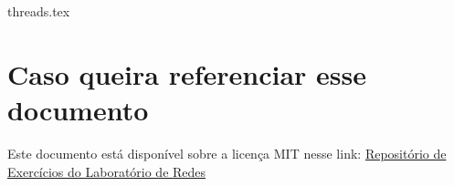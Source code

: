 \documentclass{article}
\author{}
\date{}
\title{}
\begin{document}
    

    {threads.tex}

    \section*{Caso queira referenciar esse documento}
    Este documento está disponível sobre a licença MIT nesse link: \href{https://github.com/Trees-Over-The-Lake/Laboratorio-de-Redes}{Repositório de Exercícios do Laboratório de Redes}
\end{document}
